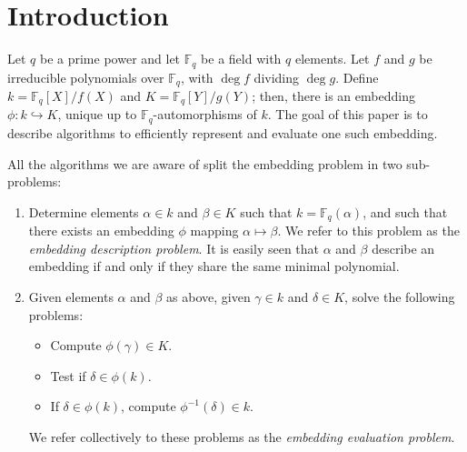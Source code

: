 \documentclass{mcom-l}
\theoremstyle{plain}
\theoremstyle{definition}
\newcommand{\F}{\ensuremath{\mathbb{F}}}
\newcounter{algorithm}
\begin{document}
\section{Introduction}
\label{sec:introduction}

Let $q$ be a prime power and let $\F_q$ be a field with $q$
elements. Let $f$ and $g$ be irreducible polynomials over $\F_q$, with
$\deg f$ dividing $\deg g$. Define $k=\F_q[X]/f(X)$ and
$K=\F_q[Y]/g(Y)$; then, there is an embedding $\phi:k\hookrightarrow
K$, unique up to $\F_q$-automorphisms of $k$. The goal of this paper
is to describe algorithms to efficiently represent and evaluate one
such embedding.

All the algorithms we are aware of split the embedding problem in two
sub-problems:
\begin{enumerate}
\item Determine elements $\alpha\in k$ and $\beta\in K$ such that
  $k=\F_q(\alpha)$, and such that there exists an
  embedding $\phi$ mapping $\alpha\mapsto\beta$. We refer to this
  problem as the \emph{embedding description problem}.
  It is easily seen that $\alpha$ and $\beta$ describe an embedding
  if and only if they share the same minimal polynomial.
\item Given elements $\alpha$ and $\beta$ as above, given $\gamma\in
  k$ and $\delta\in K$, solve the following problems:
  \begin{itemize}
  \item Compute $\phi(\gamma)\in K$.
  \item Test if $\delta\in\phi(k)$.
  \item If $\delta\in\phi(k)$, compute $\phi^{-1}(\delta)\in k$.
  \end{itemize}
  We refer collectively to these problems as the \emph{embedding
    evaluation problem}.
\end{enumerate}
\end{document}
